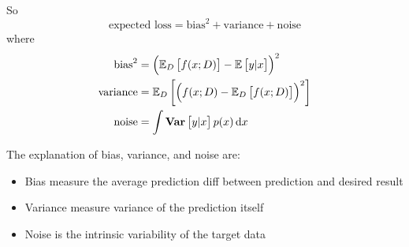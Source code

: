 So 
\begin{equation}
    \text{expected loss} = \text{bias}^2 + \text{variance} + \text{noise}
\end{equation}
where
\begin{equation}
    \begin{aligned}
        \text{bias}^2 &= \left(\expectationonanvariable{D}{f(x;D)} - \expectation{y|x}\right)^2 \\
        \text{variance} &= \expectationonanvariable{D}{\left(f(x;D) - \expectationonanvariable{D}{f(x;D)}\right)^2} \\
        \text{noise} &= \int \variance{y|x} p(x) \dif x
    \end{aligned}
\end{equation}

The explanation of bias, variance, and noise are:
\begin{itemize}
    \item Bias measure the average prediction diff between prediction and desired result
    \item Variance measure variance of the prediction itself
    \item Noise is the intrinsic variability of the target data
\end{itemize}

